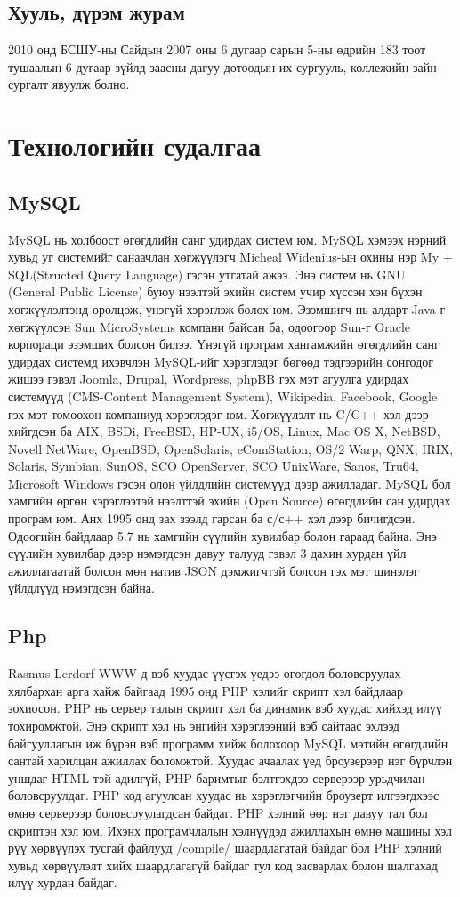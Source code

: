 \documentclass[
oneside, %
english, %
onehalfspacing, %
nolistspacing, %
headsepline, %
]{article} %
\begin{document}
	
	\subsection{Хууль, дүрэм журам}
	2010 онд БСШУ-ны Сайдын 2007 оны 6 дугаар сарын 5-ны өдрийн 183 тоот тушаалын 6 дугаар зүйлд заасны дагуу дотоодын их сургууль, коллежийн зайн сургалт явуулж болно. 
	
	
	\section{Технологийн судалгаа}
	
	\subsection{MySQL}
	MySQL нь холбоост өгөгдлийн санг удирдах систем юм. MySQL хэмээх нэрний хувьд уг системийг санаачлан хөгжүүлэгч Micheal Widenius-ын охины нэр My + SQL(Structed Query Language) гэсэн утгатай ажээ.
	Энэ систем нь GNU (General Public License) буюу нээлтэй эхийн систем учир хүссэн хэн бүхэн хөгжүүлэлтэнд оролцож, үнэгүй хэрэглэж болох юм. Эзэмшигч нь алдарт Java-г хөгжүүлсэн Sun MicroSystems компани байсан ба, одоогоор Sun-г Oracle корпораци эзэмших болсон билээ.
	Үнэгүй програм хангамжийн өгөгдлийн санг удирдах системд ихэвчлэн MySQL-ийг хэрэглэдэг бөгөөд тэдгээрийн сонгодог жишээ гэвэл Joomla, Drupal, Wordpress, phpBB гэх мэт агуулга удирдах системүүд (CMS-Content Management System), Wikipedia, Facebook, Google гэх мэт томоохон компаниуд хэрэглэдэг юм.
	Хөгжүүлэлт нь C/C++ хэл дээр хийгдсэн ба AIX, BSDi, FreeBSD, HP-UX, i5/OS, Linux, Mac OS X, NetBSD, Novell NetWare, OpenBSD, OpenSolaris, eComStation, OS/2 Warp, QNX, IRIX, Solaris, Symbian, SunOS, SCO OpenServer, SCO UnixWare, Sanos, Tru64, Microsoft Windows гэсэн олон үйлдлийн системүүд дээр ажилладаг.
	MySQL бол хамгийн өргөн хэрэглээтэй нээлттэй эхийн (Open Source) өгөгдлийн сан удирдах програм юм. Анх 1995 онд зах зээлд гарсан ба с/с++ хэл дээр бичигдсэн. Одоогийн байдлаар 5.7 нь хамгийн сүүлийн хувилбар болон гараад байна. Энэ сүүлийн хувилбар дээр нэмэгдсэн давуу талууд гэвэл 3 дахин хурдан үйл ажиллагаатай болсон мөн натив JSON дэмжигчтэй болсон гэх мэт шинэлэг үйлдлүүд нэмэгдсэн байна.
	
	\subsection{Php}
	Rasmus Lerdorf WWW-д вэб хуудас үүсгэх үедээ өгөгдөл боловсруулах хялбархан арга хайж байгаад 1995 онд PHP хэлийг скрипт хэл байдлаар зохиосон.
	PHP нь сервер талын скрипт хэл ба динамик вэб хуудас хийхэд илүү тохиромжтой. Энэ скрипт хэл нь энгийн хэрэглээний вэб сайтаас эхлээд байгууллагын иж бүрэн вэб программ хийж болохоор MySQL мэтийн өгөгдлийн сантай харилцан ажиллах боломжтой.
	Хуудас ачаалах үед броузерээр нэг бүрчлэн уншдаг HTML-тэй адилгүй, PHP баримтыг бэлтгэхдээ серверээр урьдчилан боловсруулдаг. PHP код агуулсан хуудас нь хэрэглэгчийн броузерт илгээгдхээс өмнө серверээр боловсруулагдсан байдаг.
	PHP хэлний өөр нэг давуу тал бол скриптэн хэл юм. Ихэнх програмчлалын хэлнүүдэд ажиллахын өмнө машины хэл рүү хөрвүүлэх тусгай файлууд /compile/ шаардлагатай байдаг бол PHP хэлний хувьд хөрвүүлэлт хийх шаардлагагүй байдаг тул код засварлах болон шалгахад илүү хурдан байдаг.
\end{document}
